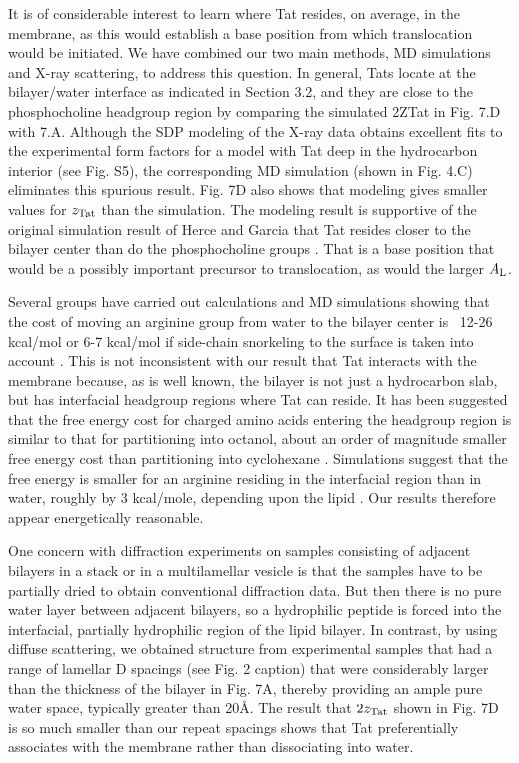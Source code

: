 It is of considerable interest to learn where Tat resides, on average, in the 
membrane, as this would establish a base position from which translocation 
would be initiated. We have combined our two main methods, MD simulations and 
X-ray scattering, to address this question. In general, Tats locate at the 
bilayer/water interface as indicated in Section 3.2, and they are close to 
the phosphocholine headgroup region by comparing the simulated 2ZTat
in Fig. 7.D with 7.A. Although the SDP modeling of the X-ray data obtains 
excellent fits to the experimental form factors for a model with Tat deep in 
the hydrocarbon interior (see Fig. S5), the corresponding MD simulation 
(shown in Fig. 4.C) eliminates this spurious result. Fig. 7D also
shows that modeling gives smaller values for $z_\textrm{Tat}$ than the simulation. 
The modeling result is supportive of the original simulation result of 
Herce and Garcia that Tat resides closer to the bilayer center than do the 
phosphocholine groups \cite{Herce07}. That is a base position that would be a
possibly important precursor to translocation, as would the larger $A_\textrm{L}$.

Several groups have carried out calculations and MD simulations showing that 
the cost of moving an arginine group from water to the bilayer center is 
~12-26 kcal/mol \cite{Johansson09,Li08,Vorobyov08,MacCallum08} 
or 6-7 kcal/mol if side-chain snorkeling to the surface is taken into 
account \cite{Schow11}. This is not inconsistent with our result that Tat 
interacts with the membrane because, as is well known, the bilayer is not
just a hydrocarbon slab, but has interfacial headgroup regions where Tat can 
reside. It has been suggested that the free energy cost for charged amino acids 
entering the headgroup region is similar to that for partitioning into octanol, 
about an order of magnitude smaller free energy cost than partitioning into 
cyclohexane \cite{Wimley96_BC,Wimley96_NSB,Roux07}. 
Simulations suggest that the free energy is smaller for an arginine residing 
in the interfacial region than in water, roughly by 3 kcal/mole, depending
upon the lipid \cite{Johansson09,Roux07}. 
Our results therefore appear energetically reasonable.

One concern with diffraction experiments on samples consisting of adjacent bilayers in a
stack or in a multilamellar vesicle is that the samples have to be partially dried to obtain
conventional diffraction data. But then there is no pure water layer between adjacent bilayers, so
a hydrophilic peptide is forced into the interfacial, partially hydrophilic region of the lipid
bilayer. In contrast, by using diffuse scattering, we obtained structure from experimental
samples that had a range of lamellar D spacings (see Fig. 2 caption) that were considerably
larger than the thickness of the bilayer in Fig. 7A, thereby providing an ample pure water space,
typically greater than 20\AA. The result that $2z_\textrm{Tat}$ shown in Fig. 7D is so much smaller than our
repeat spacings shows that Tat preferentially associates with the membrane rather than
dissociating into water.

